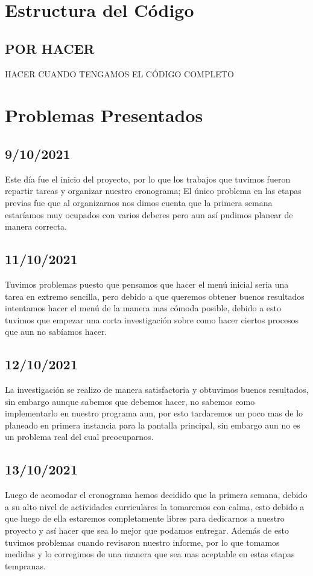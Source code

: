 \documentclass{article}
\begin{document}
        
\section{Estructura del Código}
    \subsection{POR HACER}
    HACER CUANDO TENGAMOS EL CÓDIGO COMPLETO
    
\section{Problemas Presentados}
    \subsection{9/10/2021}
    Este día fue el inicio del proyecto, por lo que los trabajos que tuvimos fueron repartir tareas y organizar nuestro cronograma; El único problema en las etapas previas fue que al organizarnos nos dimos cuenta que la primera semana estaríamos muy ocupados con varios deberes pero aun así pudimos planear de manera correcta.

    \subsection{11/10/2021}
    Tuvimos problemas puesto que pensamos que hacer el menú inicial seria una tarea en extremo sencilla, pero debido a que queremos obtener buenos resultados intentamos hacer el menú de la manera mas cómoda posible, debido a esto tuvimos que empezar una corta investigación sobre como hacer ciertos procesos que aun no sabíamos hacer.
    
    \subsection{12/10/2021}
    La investigación se realizo de manera satisfactoria y obtuvimos buenos resultados, sin embargo aunque sabemos que debemos hacer, no sabemos como implementarlo en nuestro programa aun, por esto tardaremos un poco mas de lo planeado en primera instancia para la pantalla principal, sin embargo aun no es un problema real del cual preocuparnos.
    
    \subsection{13/10/2021}
    Luego de acomodar el cronograma hemos decidido que la primera semana, debido a su alto nivel de actividades curriculares la tomaremos con calma, esto debido a que luego de ella estaremos completamente libres para dedicarnos a nuestro proyecto y así hacer que sea lo mejor que podamos entregar. Además de esto tuvimos problemas cuando revisaron nuestro informe, por lo que tomamos medidas y lo corregimos de una manera que sea mas aceptable en estas etapas tempranas.
    
\end{document}
